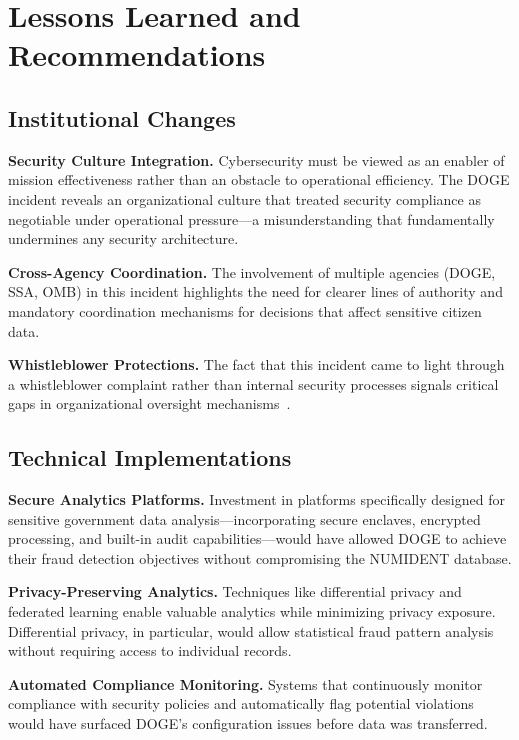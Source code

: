 \documentclass[sigconf,nonacm]{acmart}
\begin{document}
\section{Lessons Learned and Recommendations}

\subsection{Institutional Changes}

\textbf{Security Culture Integration.} Cybersecurity must be viewed as an enabler of
mission effectiveness rather than an obstacle to operational efficiency. The DOGE
incident reveals an organizational culture that treated security compliance as
negotiable under operational pressure---a misunderstanding that fundamentally
undermines any security architecture.

\textbf{Cross-Agency Coordination.} The involvement of multiple agencies (DOGE, SSA,
OMB) in this incident highlights the need for clearer lines of authority and mandatory
coordination mechanisms for decisions that affect sensitive citizen data.

\textbf{Whistleblower Protections.} The fact that this incident came to light through
a whistleblower complaint rather than internal security processes signals critical gaps
in organizational oversight mechanisms~\cite{ap2025}.

\subsection{Technical Implementations}

\textbf{Secure Analytics Platforms.} Investment in platforms specifically designed for
sensitive government data analysis---incorporating secure enclaves, encrypted processing,
and built-in audit capabilities---would have allowed DOGE to achieve their fraud
detection objectives without compromising the NUMIDENT database.

\textbf{Privacy-Preserving Analytics.} Techniques like differential privacy and
federated learning enable valuable analytics while minimizing privacy exposure.
Differential privacy, in particular, would allow statistical fraud pattern analysis
without requiring access to individual records.

\textbf{Automated Compliance Monitoring.} Systems that continuously monitor compliance
with security policies and automatically flag potential violations would have surfaced
DOGE's configuration issues before data was transferred.
\end{document}
